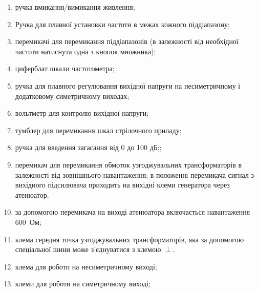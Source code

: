 \begin{enumerate}
    \item \label{btn:powerGZ56} ручка вмикання/вимикання живлення;
    \item \label{btn:fHz} Ручка \circled{\ref{btn:fHz}}  для плавної установки частоти в межах кожного піддіапазону;
    \item \label{btn:fMulyiply} перемикачі \circled{\ref{btn:fMulyiply}}  для перемикання піддіапазонів (в залежності від необхідної частоти натиснута одна з кнопок множника);
    \item \label{scale:freq} циферблат шкали частотометра;
    \item \label{btn:regexit} ручка  \circled{\ref{btn:regexit}}  для плавного регулювання вихідної напруги на несиметричному і додатковому симетричному виходах;
    \item \label{scale:Vscale} вольтметр для контролю вихідної напруги;
    \item \label{btn:Vscale}тумблер \circled{\ref{btn:Vscale}}  для перемикання шкал стрілочного приладу;
     \item \label{btn:VscaleLim} ручка  для введення загасання від 0 до 100 дБ;;
    \item \label{btn:ExtR} перемикач \circled{\ref{btn:ExtR}}  для перемикання обмоток узгоджувальних трансформаторів в залежності від зовнішнього навантаження; в положенні перемикача  сигнал з вихідного підсилювача приходить на вихідні клеми генератора через атенюатор. 
    \item \label{btn:IntR}за допомогою перемикача \circled{\ref{btn:IntR}}  на виході атенюатора включається навантаження $600$~Ом;
    \item клема  середня точка узгоджувальних трансформаторів, яка за допомогою спеціальної шини може з'єднуватися з клемою $\perp$.
    \item клема   для роботи на несиметричному виході;
    \item  клеми   для роботи на симетричному виході;
\end{enumerate}

